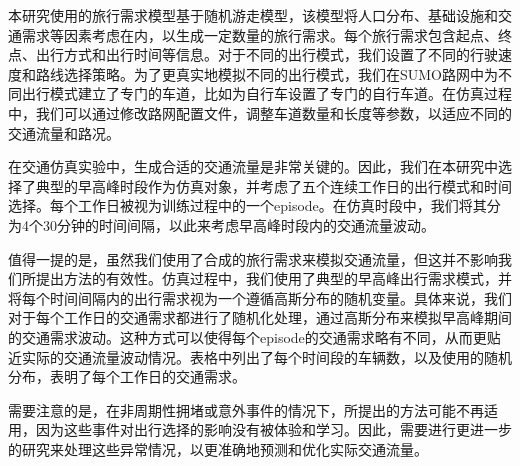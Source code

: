 本研究使用的旅行需求模型基于随机游走模型，该模型将人口分布、基础设施和交通需求等因素考虑在内，以生成一定数量的旅行需求。每个旅行需求包含起点、终点、出行方式和出行时间等信息。对于不同的出行模式，我们设置了不同的行驶速度和路线选择策略。为了更真实地模拟不同的出行模式，我们在SUMO路网中为不同出行模式建立了专门的车道，比如为自行车设置了专门的自行车道。在仿真过程中，我们可以通过修改路网配置文件，调整车道数量和长度等参数，以适应不同的交通流量和路况。

在交通仿真实验中，生成合适的交通流量是非常关键的。因此，我们在本研究中选择了典型的早高峰时段作为仿真对象，并考虑了五个连续工作日的出行模式和时间选择。每个工作日被视为训练过程中的一个episode。在仿真时段中，我们将其分为4个30分钟的时间间隔，以此来考虑早高峰时段内的交通流量波动。

值得一提的是，虽然我们使用了合成的旅行需求来模拟交通流量，但这并不影响我们所提出方法的有效性。仿真过程中，我们使用了典型的早高峰出行需求模式，并将每个时间间隔内的出行需求视为一个遵循高斯分布的随机变量。具体来说，我们对于每个工作日的交通需求都进行了随机化处理，通过高斯分布来模拟早高峰期间的交通需求波动。这种方式可以使得每个episode的交通需求略有不同，从而更贴近实际的交通流量波动情况。表格中列出了每个时间段的车辆数，以及使用的随机分布，表明了每个工作日的交通需求。

需要注意的是，在非周期性拥堵或意外事件的情况下，所提出的方法可能不再适用，因为这些事件对出行选择的影响没有被体验和学习。因此，需要进行更进一步的研究来处理这些异常情况，以更准确地预测和优化实际交通流量。

\renewcommand{\arraystretch}{1.2} %
\begin{table}[htbp]
\centering
\caption{连续五个工作日早高峰期的出行需求配置}
\label{demand_inf}
\begin{adjustbox}{center}
\end{adjustbox}
\end{table}
